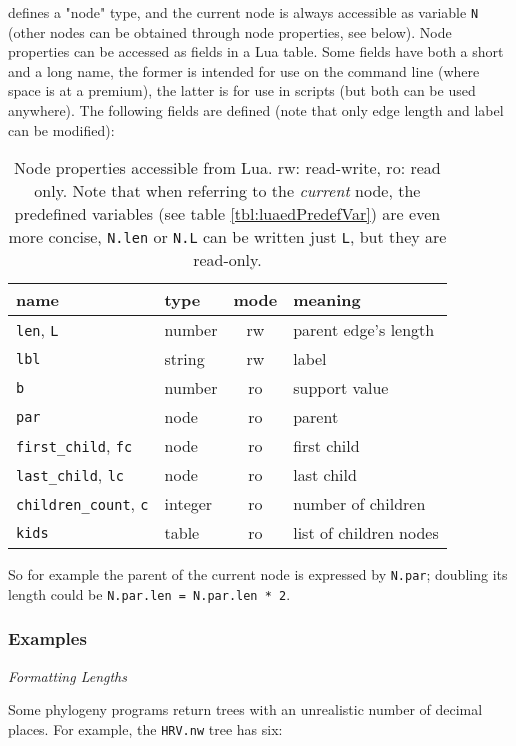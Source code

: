 \sched{} defines a "node" type, and the current node is always accessible as
variable \texttt{N} (other nodes can be obtained through node properties, see
below).  Node properties can be accessed as fields in a Lua table. Some fields
have both a short and a long name, the former is intended for use on the command
line (where space is at a premium), the latter is for use in scripts (but both
can be used anywhere). The following fields are defined (note that only edge
length and label can be modified):

\begin{table}
	\center
	\begin{tabular}{llcl}
		name & type & mode & meaning \\
		\hline
		\texttt{len}, \texttt{L} 	& number 	& rw & parent edge's length \\
		\texttt{lbl}							& string 	& rw & label \\
		\texttt{b}								& number	& ro & support value \\
		\texttt{par}							& node		& ro & parent \\
		\texttt{first\_child}, \texttt{fc}  & node & ro & first child \\
		\texttt{last\_child}, \texttt{lc} 	& node & ro & last child \\
		\texttt{children\_count}, \texttt{c} 	& integer & ro & number of children \\
		\texttt{kids}							& table		& ro & list of children nodes
	\end{tabular}
	\caption{%
		\label{tbl:luaedNodeProp}
		Node properties accessible from Lua. rw: read-write, ro: read only. Note
		that when referring to the \emph{current} node, the predefined variables
		(see table \ref{tbl:luaedPredefVar}) are even more concise, \eg{}
		\texttt{N.len} or \texttt{N.L} can be written just \texttt{L}, but they
		are read-only.
	}
\end{table}

\noindent{}So for example the parent of the current node is expressed by
\texttt{N.par}; doubling its length could be \texttt{N.par.len = N.par.len * 2}.

\subsubsection{Examples}

{\it Formatting Lengths} 

\noindent{}Some phylogeny programs return \nw{} trees with an unrealistic number
of decimal places. For example, the \texttt{HRV.nw} tree has six:

